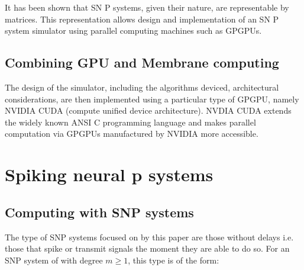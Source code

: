 \documentclass{acm_proc_article-sp}
\begin{document}
It has been shown that SN P systems, given their nature, are representable by matrices\cite{snpbrain}\cite{snpmat}. This representation allows design and implementation of an SN P system simulator using parallel computing machines such as GPGPUs. 

\subsection{Combining GPU and Membrane computing }
The design of the simulator, including the algorithms deviced, architectural considerations, are then implemented using a particular type of GPGPU, namely NVIDIA CUDA (compute unified device architecture). NVDIA CUDA extends the widely known ANSI C programming language and makes parallel computation via GPGPUs manufactured by NVIDIA more accessible.


\section{Spiking neural p systems}

\subsection{Computing with SNP systems}
The type of SNP systems focused on by this paper are those without delays i.e. those that spike or transmit signals the moment they are able to do so. For an SNP system of with degree $m\geq 1$, this type is of the form:
\end{document}
